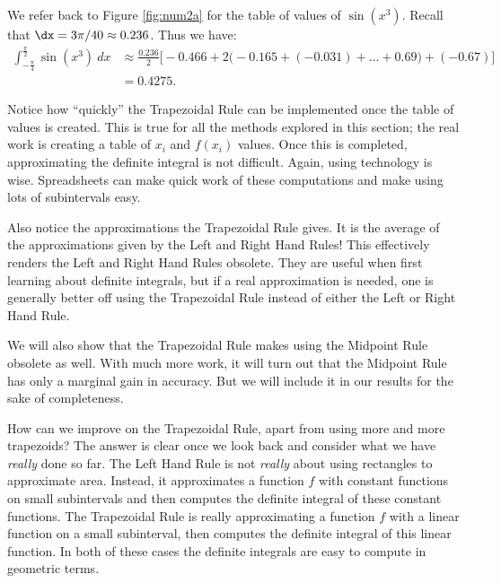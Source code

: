 {We refer back to Figure \ref{fig:num2a} for the table of values of $\sin(x^3)$. Recall that $\dx = 3\pi/40 \approx 0.236$. Thus we have:\small
\begin{align*}
\int_{-\frac{\pi}4}^{\frac{\pi}2} \sin (x^3)\ dx &\approx \frac{0.236}{2}\Big[-0.466 + 2\Big(-0.165+(-0.031)+\ldots+%
0.69\Big)+(-0.67)\Big]\\
			&= 0.4275.
\end{align*}
\normalsize}

Notice how ``quickly'' the Trapezoidal Rule can be implemented once the table of values is created. This is true for all the methods explored in this section; the real work is creating a table of $x_i$ and $f(x_i)$ values. Once this is completed, approximating the definite integral is not difficult. Again, using technology is wise. Spreadsheets can make quick work of these computations and make using lots of subintervals easy. 

Also notice the  approximations the Trapezoidal Rule gives. It is  the average of the approximations given by the Left and Right Hand Rules! This effectively renders the Left and Right Hand Rules obsolete. They are useful when first learning about definite integrals, but if a real approximation is needed, one is generally better off using the Trapezoidal Rule instead of either the Left or Right Hand Rule.

We will also show that the Trapezoidal Rule makes using the Midpoint Rule obsolete as well.  With much more work, it will turn out that the Midpoint Rule has only a marginal gain in accuracy.  But we will include it in our results for the sake of completeness.
\bigskip

How can we improve on the Trapezoidal Rule, apart from using more and more trapezoids? The answer is clear once we look back and consider what we have \textit{really} done so far. The Left Hand Rule is not \textit{really} about using rectangles to approximate area. Instead, it approximates a function $f$ with constant functions on small subintervals and then computes the definite integral of these constant functions. The Trapezoidal Rule is really approximating a function $f$ with a linear function on a small subinterval, then computes the definite integral of this linear function. In both of these cases the definite integrals are easy to compute in geometric terms.

